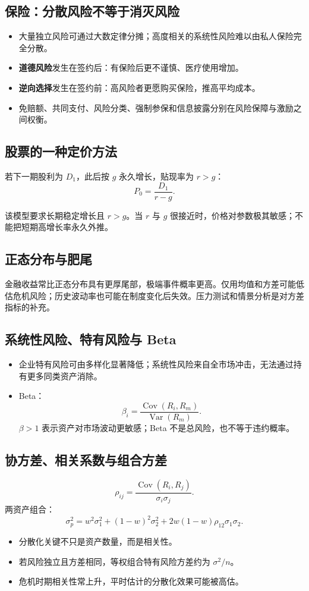 \documentclass[UTF8,11pt,a4paper]{ctexart}
\newcommand{\term}[1]{\textbf{#1}}
\begin{document}
\subsection{保险：分散风险不等于消灭风险}
\begin{itemize}
  \item 大量独立风险可通过大数定律分摊；高度相关的系统性风险难以由私人保险完全分散。
  \item \term{道德风险}发生在签约后：有保险后更不谨慎、医疗使用增加。
  \item \term{逆向选择}发生在签约前：高风险者更愿购买保险，推高平均成本。
  \item 免赔额、共同支付、风险分类、强制参保和信息披露分别在风险保障与激励之间权衡。
\end{itemize}

\subsection{股票的一种定价方法}
若下一期股利为 $D_1$，此后按 $g$ 永久增长，贴现率为 $r>g$：
\[
P_0=\frac{D_1}{r-g}.
\]
\begin{warningbox}[条件与敏感性]
该模型要求长期稳定增长且 $r>g$。当 $r$ 与 $g$ 很接近时，价格对参数极其敏感；不能把短期高增长率永久外推。
\end{warningbox}

\subsection{正态分布与肥尾}
金融收益常比正态分布具有更厚尾部，极端事件概率更高。仅用均值和方差可能低估危机风险；历史波动率也可能在制度变化后失效。压力测试和情景分析是对方差指标的补充。

\subsection{系统性风险、特有风险与 Beta}
\begin{itemize}
  \item 企业特有风险可由多样化显著降低；系统性风险来自全市场冲击，无法通过持有更多同类资产消除。
  \item Beta：
  \[
  \beta_i=\frac{\operatorname{Cov}(R_i,R_m)}{\operatorname{Var}(R_m)}.
  \]
  $\beta>1$ 表示资产对市场波动更敏感；Beta 不是总风险，也不等于违约概率。
\end{itemize}

\subsection{协方差、相关系数与组合方差}
\[
\rho_{ij}=\frac{\operatorname{Cov}(R_i,R_j)}{\sigma_i\sigma_j}.
\]
两资产组合：
\[
\sigma_p^2=w^2\sigma_1^2+(1-w)^2\sigma_2^2+2w(1-w)\rho_{12}\sigma_1\sigma_2.
\]
\begin{itemize}
  \item 分散化关键不只是资产数量，而是相关性。
  \item 若风险独立且方差相同，等权组合特有风险方差约为 $\sigma^2/n$。
  \item 危机时期相关性常上升，平时估计的分散化效果可能被高估。
\end{itemize}
\end{document}
